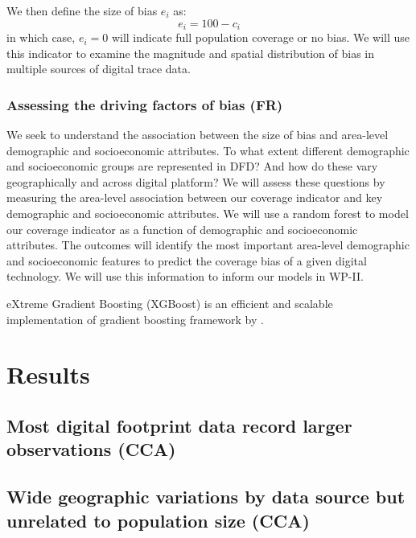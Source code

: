 \documentclass[]{rsos}%
\begin{document}
We then define the size of bias \(e_i\) as: \begin{equation}
e_i = 100 - c_i
\end{equation} in which case, \(e_i = 0\) will indicate full population
coverage or no bias. We will use this indicator to examine the magnitude
and spatial distribution of bias in multiple sources of digital trace
data.

\subsubsection{Assessing the driving factors of bias (FR)}\label{assessing-the-driving-factors-of-bias-fr}

We seek to understand the association between the size of bias and
area-level demographic and socioeconomic attributes. To what extent
different demographic and socioeconomic groups are represented in DFD?
And how do these vary geographically and across digital platform? We
will assess these questions by measuring the area-level association
between our coverage indicator and key demographic and socioeconomic
attributes. We will use a random forest to model our coverage indicator
as a function of demographic and socioeconomic attributes. The outcomes
will identify the most important area-level demographic and
socioeconomic features to predict the coverage bias of a given digital
technology. We will use this information to inform our models in WP-II.

eXtreme Gradient Boosting (XGBoost) is an efficient and scalable
implementation of gradient boosting framework by \citep{friedman2001, friedman2000}.

\section{Results}\label{results}

\subsection{Most digital footprint data record larger observations (CCA)}\label{most-digital-footprint-data-record-larger-observations-cca}

\subsection{Wide geographic variations by data source but unrelated to population size (CCA)}\label{wide-geographic-variations-by-data-source-but-unrelated-to-population-size-cca}
\end{document}
